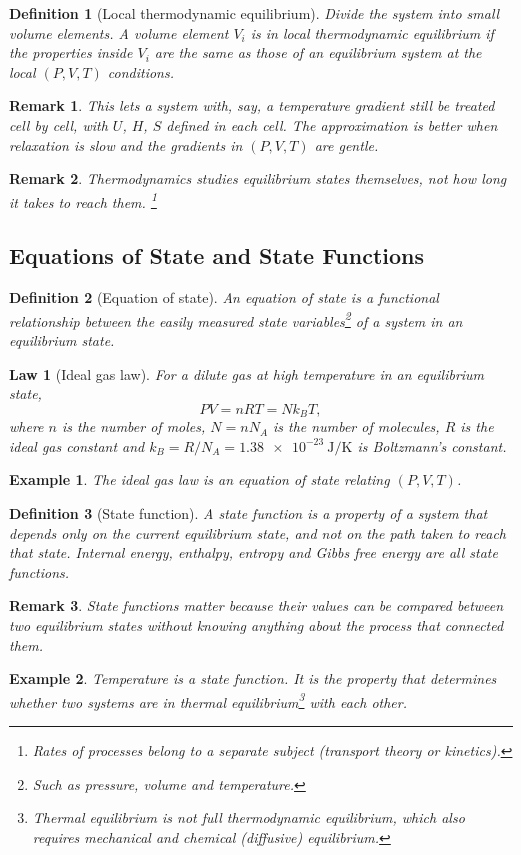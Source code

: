 \documentclass{article}
\newtheorem{law}{Law}
\newtheorem{definition}{Definition}
\newtheorem*{example}{Example}
\newtheorem{remark}{Remark}
\begin{document}
\begin{definition}[Local thermodynamic equilibrium]
    Divide the system into small volume elements. A volume element $V_i$ is in local thermodynamic equilibrium if the properties inside $V_i$ are the same as those of an equilibrium system at the local $(P, V, T)$ conditions. %
\end{definition}
\begin{remark}
    This lets a system with, say, a temperature gradient still be treated cell by cell, with $U$, $H$, $S$ defined in each cell. The approximation is better when relaxation is slow and the gradients in $(P,V,T)$ are gentle.
\end{remark}
\begin{remark}
    Thermodynamics studies equilibrium states themselves, not how long it takes to reach them. \footnote{Rates of processes belong to a separate subject (transport theory or kinetics).}
\end{remark}

\subsection{Equations of State and State Functions}
\begin{definition}[Equation of state]
    An equation of state is a functional relationship between the easily measured state variables\footnote{Such as pressure, volume and temperature.} of a system in an equilibrium state.
\end{definition}
\begin{law}[Ideal gas law]
    For a dilute gas at high temperature in an equilibrium state,
    \begin{equation}
        PV = nRT = N k_B T,
    \end{equation}
    where $n$ is the number of moles, $N = n N_A$ is the number of molecules, $R$ is the ideal gas constant and $k_B = R/N_A = \SI{1.38e-23}{\joule\per\kelvin}$ is Boltzmann's constant.
\end{law}
\begin{example}
    The ideal gas law is an equation of state relating $(P, V, T)$.
\end{example}
\begin{definition}[State function]
    A state function is a property of a system that depends only on the current equilibrium state, and not on the path taken to reach that state. Internal energy, enthalpy, entropy and Gibbs free energy are all state functions.
\end{definition}
\begin{remark}
    State functions matter because their values can be compared between two equilibrium states without knowing anything about the process that connected them.
\end{remark}
\begin{example}
    Temperature is a state function. It is the property that determines whether two systems are in thermal equilibrium\footnote{Thermal equilibrium is not full thermodynamic equilibrium, which also requires mechanical and chemical (diffusive) equilibrium.} with each other.
\end{example}
\end{document}
